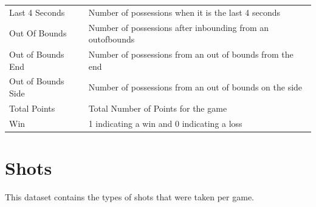 \documentclass[]{book}
\begin{document}
\begin{longtable}[]{@{}ll@{}}
\begin{minipage}[t]{0.32\columnwidth}
Last 4 Seconds\strut
\end{minipage} & \begin{minipage}[t]{0.62\columnwidth}\raggedright
Number of possessions when it is the last 4 seconds\strut
\end{minipage}\tabularnewline
\begin{minipage}[t]{0.32\columnwidth}\raggedright
Out Of Bounds\strut
\end{minipage} & \begin{minipage}[t]{0.62\columnwidth}\raggedright
Number of possessions after inbounding from an outofbounds\strut
\end{minipage}\tabularnewline
\begin{minipage}[t]{0.32\columnwidth}\raggedright
Out of Bounds End\strut
\end{minipage} & \begin{minipage}[t]{0.62\columnwidth}\raggedright
Number of possessions from an out of bounds from the end\strut
\end{minipage}\tabularnewline
\begin{minipage}[t]{0.32\columnwidth}\raggedright
Out of Bounds Side\strut
\end{minipage} & \begin{minipage}[t]{0.62\columnwidth}\raggedright
Number of possessions from an out of bounds on the side\strut
\end{minipage}\tabularnewline
\begin{minipage}[t]{0.32\columnwidth}\raggedright
Total Points\strut
\end{minipage} & \begin{minipage}[t]{0.62\columnwidth}\raggedright
Total Number of Points for the game\strut
\end{minipage}\tabularnewline
\begin{minipage}[t]{0.32\columnwidth}\raggedright
Win\strut
\end{minipage} & \begin{minipage}[t]{0.62\columnwidth}\raggedright
1 indicating a win and 0 indicating a loss\strut
\end{minipage}\tabularnewline
\bottomrule
\end{longtable}

\hypertarget{shots}{%
\section{Shots}\label{shots}}

This dataset contains the types of shots that were taken per game.
\end{document}
